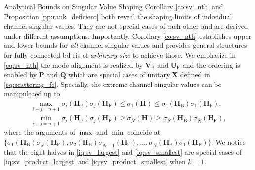 \documentclass[journal]{IEEEtran}
\begin{document}
\begin{section}{Analytical Bounds on Singular Value Shaping}
		Corollary \ref{co:sv_nth} and Proposition \ref{pp:rank_deficient} both reveal the shaping limits of individual channel singular values.
		They are not special cases of each other and are derived under different assumptions.
		Importantly, Corollary \ref{co:sv_nth} establishes upper and lower bounds for \emph{all} channel singular values and provides general structures for fully-connected \gls{bd}-\gls{ris} of \emph{arbitrary size} to achieve those.
		We emphasize in \eqref{eq:sv_nth} the mode alignment is realized by $\mathbf{V}_\mathrm{B}$ and $\mathbf{U}_\mathrm{F}$ and the ordering is enabled by $\mathbf{P}$ and $\mathbf{Q}$ which are special cases of unitary $\mathbf{X}$ defined in \eqref{eq:scattering_fc}.
		Specially, the extreme channel singular values can be manipulated up to
		\begin{subequations}
			\label{iq:sv_extreme}
			\begin{gather}
				\max_{i+j=n+1} \sigma_i(\mathbf{H}_\mathrm{B}) \sigma_j(\mathbf{H}_\mathrm{F}) {\le} \sigma_1(\mathbf{H}) {\le} \sigma_1(\mathbf{H}_\mathrm{B}) \sigma_1(\mathbf{H}_\mathrm{F}), \label{iq:sv_largest} \\
				\min_{i+j=n+1} \sigma_i(\mathbf{H}_\mathrm{B}) \sigma_j(\mathbf{H}_\mathrm{F}) {\ge} \sigma_{\bar{N}}(\mathbf{H}) {\ge} \sigma_{\bar{N}}(\mathbf{H}_\mathrm{B}) \sigma_{\bar{N}}(\mathbf{H}_\mathrm{F}), \label{iq:sv_smallest}
			\end{gather}
		\end{subequations}
		where the arguments of $\max$ and $\min$ coincide at $\bigl\{\sigma_1(\mathbf{H}_\mathrm{B}) \sigma_{\bar{N}}(\mathbf{H}_\mathrm{F}), \sigma_2(\mathbf{H}_\mathrm{B}) \sigma_{\bar{N}-1}(\mathbf{H}_\mathrm{F}), \ldots, \sigma_{\bar{N}}(\mathbf{H}_\mathrm{B}) \sigma_1(\mathbf{H}_\mathrm{F})\bigr\}$.
		We notice that the right halves in \eqref{iq:sv_largest} and \eqref{iq:sv_smallest} are special cases of \eqref{iq:sv_product_largest} and \eqref{iq:sv_product_smallest} when $k=1$.


\end{section}
\end{document}
